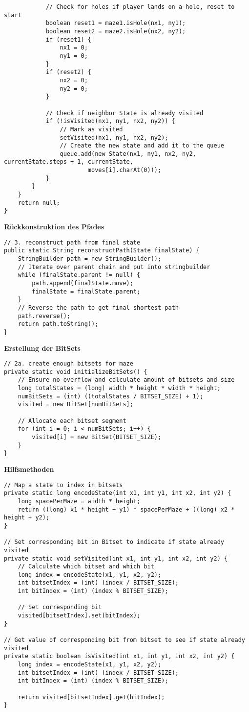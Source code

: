 \documentclass[a4paper,10pt,ngerman]{scrartcl}
\begin{document}
\begin{lstlisting}
            // Check for holes if player lands on a hole, reset to start
            boolean reset1 = maze1.isHole(nx1, ny1);
            boolean reset2 = maze2.isHole(nx2, ny2);
            if (reset1) {
                nx1 = 0;
                ny1 = 0;
            }
            if (reset2) {
                nx2 = 0;
                ny2 = 0;
            }

            // Check if neighbor State is already visited
            if (!isVisited(nx1, ny1, nx2, ny2)) {
                // Mark as visited
                setVisited(nx1, ny1, nx2, ny2);
                // Create the new state and add it to the queue
                queue.add(new State(nx1, ny1, nx2, ny2, currentState.steps + 1, currentState,
                        moves[i].charAt(0)));
            }
        }
    }
    return null;
}
\end{lstlisting}
\textbf{Rückkonstruktion des Pfades}
\begin{lstlisting}
// 3. reconstruct path from final state
public static String reconstructPath(State finalState) {
    StringBuilder path = new StringBuilder();
    // Iterate over parent chain and put into stringbuilder
    while (finalState.parent != null) {
        path.append(finalState.move);
        finalState = finalState.parent;
    }
    // Reverse the path to get final shortest path
    path.reverse();
    return path.toString();
}
\end{lstlisting}
\textbf{Erstellung der BitSets}
\begin{lstlisting}
// 2a. create enough bitsets for maze
private static void initializeBitSets() {
    // Ensure no overflow and calculate amount of bitsets and size
    long totalStates = (long) width * height * width * height;
    numBitSets = (int) ((totalStates / BITSET_SIZE) + 1);
    visited = new BitSet[numBitSets];

    // Allocate each bitset segment
    for (int i = 0; i < numBitSets; i++) {
        visited[i] = new BitSet(BITSET_SIZE);
    }
}
\end{lstlisting}
\textbf{Hilfsmethoden}
\begin{lstlisting}
// Map a state to index in bitsets
private static long encodeState(int x1, int y1, int x2, int y2) {
    long spacePerMaze = width * height;
    return ((long) x1 * height + y1) * spacePerMaze + ((long) x2 * height + y2);
}

// Set corresponding bit in Bitset to indicate if state already visited
private static void setVisited(int x1, int y1, int x2, int y2) {
    // Calculate which bitset and which bit
    long index = encodeState(x1, y1, x2, y2);
    int bitsetIndex = (int) (index / BITSET_SIZE);
    int bitIndex = (int) (index % BITSET_SIZE);

    // Set corresponding bit
    visited[bitsetIndex].set(bitIndex);
}

// Get value of corresponding bit from bitset to see if state already visited
private static boolean isVisited(int x1, int y1, int x2, int y2) {
    long index = encodeState(x1, y1, x2, y2);
    int bitsetIndex = (int) (index / BITSET_SIZE);
    int bitIndex = (int) (index % BITSET_SIZE);

    return visited[bitsetIndex].get(bitIndex);
}
\end{lstlisting}
\end{document}
